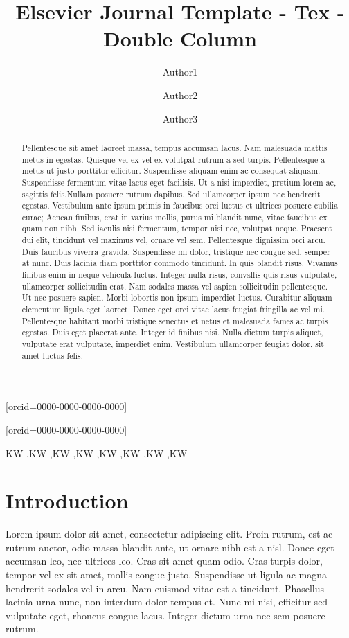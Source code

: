 \documentclass[a4paper,fleqn]{cas-dc}
\begin{document}
\title [mode = title]{Elsevier Journal Template - Tex - Double Column}  
\author[1]{Author1} [orcid=0000-0000-0000-0000]
\author[1]{Author2} [orcid=0000-0000-0000-0000]
\cormark[1]
\author[1]{Author3} 

\address[1]{Example University}
\begin{abstract}
Pellentesque sit amet laoreet massa, tempus accumsan lacus. Nam malesuada mattis metus in egestas. Quisque vel ex vel ex volutpat rutrum a sed turpis. Pellentesque a metus ut justo porttitor efficitur. Suspendisse aliquam enim ac consequat aliquam. Suspendisse fermentum vitae lacus eget facilisis. Ut a nisi imperdiet, pretium lorem ac, sagittis felis.Nullam posuere rutrum dapibus. Sed ullamcorper ipsum nec hendrerit egestas. Vestibulum ante ipsum primis in faucibus orci luctus et ultrices posuere cubilia curae; Aenean finibus, erat in varius mollis, purus mi blandit nunc, vitae faucibus ex quam non nibh. Sed iaculis nisi fermentum, tempor nisi nec, volutpat neque. Praesent dui elit, tincidunt vel maximus vel, ornare vel sem. Pellentesque dignissim orci arcu. Duis faucibus viverra gravida. Suspendisse mi dolor, tristique nec congue sed, semper at nunc. Duis lacinia diam porttitor commodo tincidunt. In quis blandit risus. Vivamus finibus enim in neque vehicula luctus. Integer nulla risus, convallis quis risus vulputate, ullamcorper sollicitudin erat. Nam sodales massa vel sapien sollicitudin pellentesque. Ut nec posuere sapien. Morbi lobortis non ipsum imperdiet luctus. Curabitur aliquam elementum ligula eget laoreet. Donec eget orci vitae lacus feugiat fringilla ac vel mi. Pellentesque habitant morbi tristique senectus et netus et malesuada fames ac turpis egestas. Duis eget placerat ante. Integer id finibus nisi. Nulla dictum turpis aliquet, vulputate erat vulputate, imperdiet enim. Vestibulum ullamcorper feugiat dolor, sit amet luctus felis.
\end{abstract}

\begin{keywords}
KW \sep KW \sep KW \sep KW \sep KW \sep KW \sep KW \sep KW
\end{keywords}
\maketitle

\section{Introduction}
Lorem ipsum dolor sit amet, consectetur adipiscing elit. Proin rutrum, est ac rutrum auctor, odio massa blandit ante, ut ornare nibh est a nisl. Donec eget accumsan leo, nec ultrices leo. Cras sit amet quam odio. Cras turpis dolor, tempor vel ex sit amet, mollis congue justo. Suspendisse ut ligula ac magna hendrerit sodales vel in arcu. Nam euismod vitae est a tincidunt. Phasellus lacinia urna nunc, non interdum dolor tempus et. Nunc mi nisi, efficitur sed vulputate eget, rhoncus congue lacus. Integer dictum urna nec sem posuere rutrum.
\end{document}
